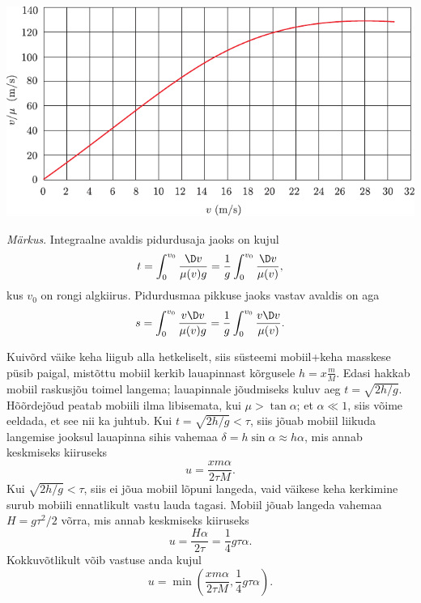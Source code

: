 \documentclass[10pt]{article}
\begin{document}
{\begin{center}
	\includegraphics[width=\linewidth]{2006-lahg-10-lah2}
\end{center}

\emph{Märkus}. Integraalne avaldis pidurdusaja jaoks on kujul
\[
t=\int_{0}^{v_{0}} \frac{\D v}{\mu(v) g}=\frac{1}{g} \int_{0}^{v_{0}} \frac{\D v}{\mu(v)},
\]
kus $v_0$ on rongi algkiirus. Pidurdusmaa pikkuse jaoks vastav avaldis on aga
\[
s=\int_{0}^{v_{0}} \frac{v \D v}{\mu(v) g}=\frac{1}{g} \int_{0}^{v_{0}} \frac{v \D v}{\mu(v)}.
\]
\probend
\bigskip


\solu
Kuivõrd väike keha liigub alla hetkeliselt, siis süsteemi mobiil+keha masskese püsib paigal, mistõttu mobiil kerkib lauapinnast kõrgusele $h=x\frac mM$.
Edasi hakkab mobiil raskusjõu toimel langema; lauapinnale jõudmiseks kuluv aeg $t=\sqrt{2h/g}$. Hõõrdejõud peatab mobiili ilma libisemata, kui $\mu>\tan\alpha$; et
$\alpha \ll 1$, siis võime eeldada, et see nii ka juhtub. Kui $t=\sqrt{2h/g}<\tau$, siis jõuab mobiil liikuda langemise jooksul lauapinna sihis vahemaa $\delta=h\sin\alpha\approx h\alpha$,
mis annab keskmiseks kiiruseks $$u=\frac{xm\alpha}{2\tau M}.$$ Kui $\sqrt{2h/g}<\tau$, siis ei jõua mobiil lõpuni langeda, vaid väikese keha kerkimine surub mobiili ennatlikult vastu lauda tagasi.
Mobiil jõuab langeda vahemaa $H=g\tau^2/2$ võrra, mis annab keskmiseks kiiruseks
$$u=\frac{H\alpha}{2\tau}=\frac 14 g\tau\alpha.$$
Kokkuvõtlikult võib vastuse anda kujul
$$u=\min\left(\frac{xm\alpha}{2\tau M}, \frac 14 g\tau\alpha\right).$$
\probend
\bigskip


}
\end{document}
